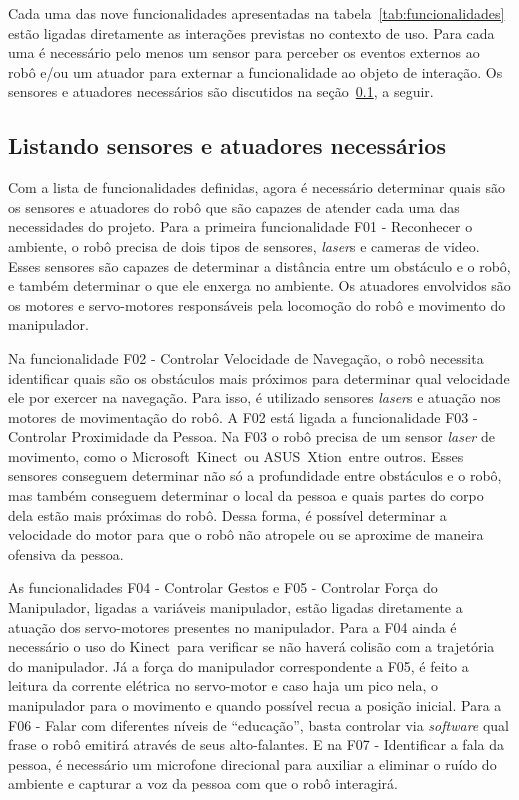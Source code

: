 Cada uma das nove funcionalidades apresentadas na tabela~\ref{tab:funcionalidades} estão ligadas diretamente as interações previstas no contexto de uso. Para cada uma é necessário pelo menos um sensor para perceber os eventos externos ao robô e/ou um atuador para externar a funcionalidade ao objeto de interação. Os sensores e atuadores necessários são discutidos na seção~\ref{sec:sensoresatuadores}, a seguir.

\subsection{Listando sensores e atuadores necessários}
\label{sec:sensoresatuadores}
Com a lista de funcionalidades definidas, agora é necessário determinar quais são os sensores e atuadores do robô que são capazes de atender cada uma das necessidades do projeto. Para a primeira funcionalidade F01 - Reconhecer o ambiente, o robô precisa de dois tipos de sensores, \emph{laser}s e cameras de video. Esses sensores são capazes de determinar a distância entre um obstáculo e o robô, e também determinar o que ele enxerga no ambiente. Os atuadores envolvidos são os motores e servo-motores responsáveis pela locomoção do robô e movimento do manipulador.

Na funcionalidade F02 - Controlar Velocidade de Navegação, o robô necessita identificar quais são os obstáculos mais próximos para determinar qual velocidade ele por exercer na navegação. Para isso, é utilizado sensores \emph{laser}s e atuação nos motores de movimentação do robô. A F02 está ligada a funcionalidade F03 - Controlar Proximidade da Pessoa. Na F03 o robô precisa de um sensor \emph{laser} de movimento, como o Microsoft\textregistered\ Kinect\textregistered\ ou ASUS\textregistered\ Xtion\textregistered\, entre outros. Esses sensores conseguem determinar não só a profundidade entre obstáculos e o robô, mas também conseguem determinar o local da pessoa e quais partes do corpo dela estão mais próximas do robô. Dessa forma, é possível determinar a velocidade do motor para que o robô não atropele ou se aproxime de maneira ofensiva da pessoa.

As funcionalidades F04 - Controlar Gestos e F05 - Controlar Força do Manipulador, ligadas a variáveis manipulador, estão ligadas diretamente a atuação dos servo-motores presentes no manipulador. Para a F04 ainda é necessário o uso do Kinect\textregistered\ para verificar se não haverá colisão com a trajetória do manipulador. Já a força do manipulador correspondente a F05, é feito a leitura da corrente elétrica no servo-motor e caso haja um pico nela, o manipulador para o movimento e quando possível recua a posição inicial. Para a F06 - Falar com diferentes níveis de ``educação'', basta controlar via \emph{software} qual frase o robô emitirá através de seus alto-falantes. E na F07 - Identificar a fala da pessoa, é necessário um microfone direcional para auxiliar a eliminar o ruído do ambiente e capturar a voz da pessoa com que o robô interagirá.


